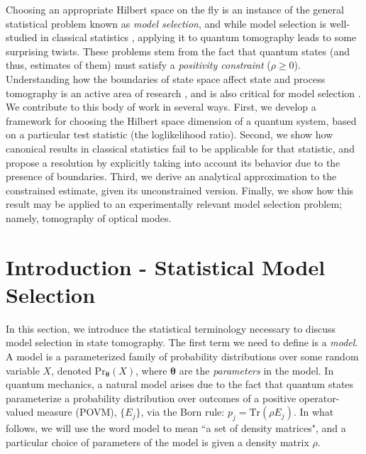\documentclass[aps,pra, twocolumn]{revtex4-1}
\newcommand{\bs}[1]{\boldsymbol{#1}}
\begin{document}
Choosing an appropriate Hilbert space on the fly is an instance of the general statistical problem known as \emph{model selection}, and while model selection is well-studied in classical statistics \cite{Burnham2004}, applying it to quantum tomography leads to some surprising twists.  These problems stem from the fact that quantum states (and thus, estimates of them) must satisfy a \emph{positivity constraint} ($\rho\geq0$). Understanding how the boundaries of state space affect state and process tomography  is an active area of research \cite{Candes2006, Flammia2012a, Suess2016, Carpentier2015}, and is also critical for model selection \cite{Schwarz2013a, Guta2012a, VanEnk2013a, Yin2011, Moroder2013, Knips2015}. We contribute to this body of work in several ways. First, we develop a framework for choosing the Hilbert space dimension of a quantum system, based on a particular test statistic (the loglikelihood ratio). Second, we show how canonical results in classical statistics fail to be applicable for that statistic, and propose a resolution by explicitly taking into account its behavior due to the presence of boundaries. Third, we derive an analytical approximation to the constrained estimate, given its unconstrained version. Finally, we show how this result may be applied to an experimentally relevant model selection problem; namely, tomography of optical modes.

\section{Introduction - Statistical Model Selection}

In this section, we introduce the statistical terminology necessary to discuss model selection in state tomography. The first term we need to define is a \emph{model}. A model is a parameterized family of probability distributions over some random variable $X$, denoted $\mathrm{Pr}_{\bs{\theta}}(X)$, where $\bs{\theta}$ are the \emph{parameters} in the model. In quantum mechanics, a natural model arises due to the fact that quantum states parameterize a probability distribution over outcomes of a positive operator-valued measure (POVM), $\{E_{j}\}$, via the Born rule: $p_{j} = \mathrm{Tr}(\rho E_{j})$. In what follows, we will use the word model to mean ``a set of density matrices", and a particular choice of parameters of the model is given a density matrix $\rho$.
\end{document}
